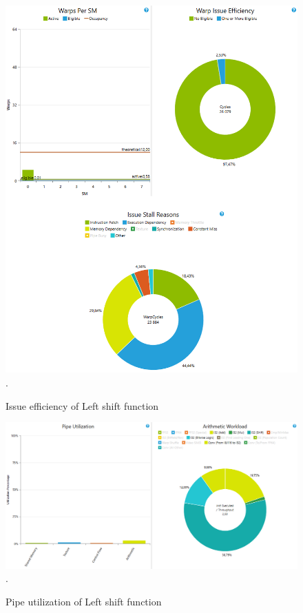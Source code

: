 \documentclass[oneside,openright,12pt,final,en]{mgr}
\begin{document}
\begin{figure}[H]
	\centering
	\includegraphics[width=\textwidth]{leftshift_issue}.
	\caption{Issue efficiency of Left shift function}
	\label{fig:leftshift_issue}
\end{figure}

\begin{figure}[H]
	\centering
	\includegraphics[width=\textwidth]{leftshift_pipe}.
	\caption{Pipe utilization of Left shift function}
	\label{fig:leftshift_pipe}
\end{figure}
\end{document}
